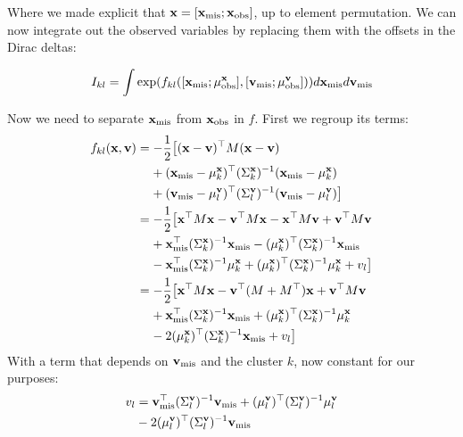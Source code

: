 \documentclass[letterpaper]{article}
\newcommand{\tp}{\top}
\newcommand{\vx}{{\bf x}}
\newcommand{\vv}{{\bf v}}
\newcommand{\mis}{\text{mis}}
\newcommand{\obs}{\text{obs}}
\begin{document}
Where we made explicit that $\vx = [\vx_\text{mis}; \vx_\text{obs}]$, up to
element permutation.
We can now integrate out the observed variables by replacing them with the
offsets in the Dirac deltas:

\begin{equation*}
  I_{kl} = \int \exp( f_{kl}([\vx_\text{mis}; \mu^\vx_\text{obs}], [\vv_\text{mis}; \mu^\vv_\text{obs}]) ) d\vx_\text{mis}d\vv_\text{mis}
\end{equation*}

Now we need to separate $\vx_\mis$ from $\vx_\obs$ in $f$. First we regroup its terms:
\begin{equation*}
\begin{aligned}
f_{kl}(\vx, \vv) &= - \frac{1}{2}\big[(\vx-\vv)^\tp M (\vx-\vv) \\
&\hspace{1.1em}+ (\vx_\text{mis} - \mu_k^\vx)^\tp (\Sigma_k^\vx)^{-1}(\vx_\text{mis} - \mu_k^\vx ) \\
&\hspace{1.1em}+ (\vv_\text{mis} - \mu_l^\vv)^\tp (\Sigma_l^\vv)^{-1}(\vv_\text{mis} - \mu_l^\vv) \big] \\
&= -\frac{1}{2}\big[\vx^\tp M \vx - \vv^\tp M \vx - \vx^\tp M \vv + \vv^\tp M \vv \\
&\hspace{1.1em}+ \vx_\text{mis}^\tp  (\Sigma_k^\vx)^{-1}\vx_\text{mis} - (\mu_k^\vx)^\tp (\Sigma_k^\vx)^{-1} \vx_\text{mis} \\
&\hspace{1.1em}- \vx_\text{mis}^\tp (\Sigma_k^\vx)^{-1} \mu_k^\vx + (\mu_k^\vx)^\tp (\Sigma_k^\vx)^{-1} \mu_k^\vx + v_l \big] \\
&= -\frac{1}{2}\big[\vx^\tp M \vx - \vv^\tp (M+M^\tp) \vx + \vv^\tp M \vv \\
&\hspace{1.1em}+ \vx_\text{mis}^\tp  (\Sigma_k^\vx)^{-1}\vx_\text{mis} + (\mu_k^\vx)^\tp (\Sigma_k^\vx)^{-1} \mu_k^\vx \\
&\hspace{1.1em}- 2 (\mu_k^\vx)^\tp (\Sigma_k^\vx)^{-1} \vx_\text{mis}  + v_l \big] \\
\end{aligned}
\end{equation*}
With a term that depends on $\vv_\mis$ and the cluster $k$, now constant for our purposes:
\begin{equation*}
\begin{aligned}
v_l &= \vv_\text{mis}^\tp  (\Sigma_l^\vv)^{-1}\vv_\text{mis} + (\mu_l^\vv)^\tp (\Sigma_l^\vv)^{-1} \mu_l^\vv \\
&- 2 (\mu_l^\vv)^\tp (\Sigma_l^\vv)^{-1}\vv_\text{mis} \\
\end{aligned}
\end{equation*}
\end{document}
